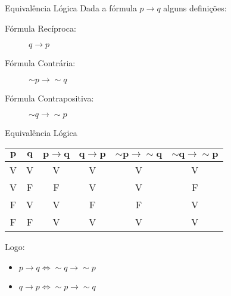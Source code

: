 \begin{frame}[t]{Equivalência Lógica} %
	Dada a fórmula $p \rightarrow q$ alguns definições:

	\begin{description}
	\item[Fórmula Recíproca:] $q \rightarrow p$
	\item[Fórmula Contrária:] $\sim p \rightarrow \sim q$
	\item[Fórmula Contrapositiva:] $\sim q \rightarrow \sim p$
	\end{description}
\end{frame}
\begin{frame}[t]{Equivalência Lógica} %
	\begin{center}
	\begin{tabular}{|c|c|c|c|c|c|}
	\hline
	$\mathbf{p}$ & $\mathbf{q}$ & $\mathbf{p \rightarrow q}$ & $\mathbf{q \rightarrow p}$ & $\mathbf{\sim p \rightarrow\sim q}$ & $\mathbf{\sim q \rightarrow \sim p}$ \\
	\hline
	V & V & V & V & V & V \\
	\hline
	V & F & F & V & V & F \\
	\hline
	F & V & V & F & F & V \\
	\hline
	F & F & V & V & V & V \\
	\hline
	\end{tabular}
	\end{center}

	Logo:

	\begin{itemize}
	\item $p \rightarrow q \Leftrightarrow \sim q \rightarrow \sim p$
	\item $q \rightarrow p \Leftrightarrow \sim p \rightarrow \sim q$
	\end{itemize}
\end{frame}
